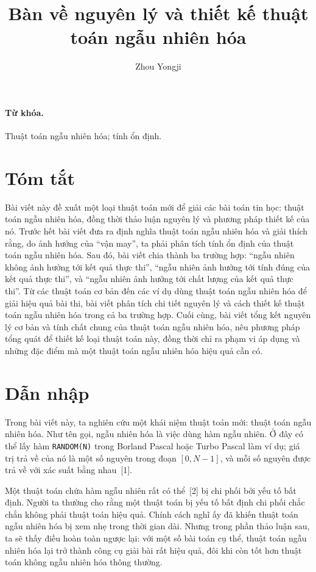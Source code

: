 \documentclass[11pt]{article}
\title{Bàn về nguyên lý và thiết kế thuật toán ngẫu nhiên hóa}
\author{Zhou Yongji}
\date{}
\begin{document}
\maketitle


\paragraph{Từ khóa.}
Thuật toán ngẫu nhiên hóa; tính ổn định.

\section*{Tóm tắt}

Bài viết này đề xuất một loại thuật toán mới để giải các bài toán tin học:
thuật toán ngẫu nhiên hóa, đồng thời thảo luận nguyên lý và phương pháp thiết
kế của nó. Trước hết bài viết đưa ra định nghĩa thuật toán ngẫu nhiên hóa và
giải thích rằng, do ảnh hưởng của ``vận may'', ta phải phân tích tính ổn định
của thuật toán ngẫu nhiên hóa. Sau đó, bài viết chia thành ba trường hợp:
``ngẫu nhiên không ảnh hưởng tới kết quả thực thi'', ``ngẫu nhiên ảnh hưởng
tới tính đúng của kết quả thực thi'', và ``ngẫu nhiên ảnh hưởng tới chất lượng
của kết quả thực thi''. Từ các thuật toán cơ bản đến các ví dụ dùng thuật
toán ngẫu nhiên hóa để giải hiệu quả bài thi, bài viết phân tích chi tiết
nguyên lý và cách thiết kế thuật toán ngẫu nhiên hóa trong cả ba trường hợp.
Cuối cùng, bài viết tổng kết nguyên lý cơ bản và tính chất chung của thuật
toán ngẫu nhiên hóa, nêu phương pháp tổng quát để thiết kế loại thuật toán
này, đồng thời chỉ ra phạm vi áp dụng và những đặc điểm mà một thuật toán
ngẫu nhiên hóa hiệu quả cần có.

\section{Dẫn nhập}

Trong bài viết này, ta nghiên cứu một khái niệm thuật toán mới: thuật toán
ngẫu nhiên hóa. Như tên gọi, ngẫu nhiên hóa là việc dùng hàm ngẫu nhiên. Ở
đây có thể lấy hàm \texttt{RANDOM(N)} trong Borland Pascal hoặc Turbo Pascal
làm ví dụ; giá trị trả về của nó là một số nguyên trong đoạn \([0,N-1]\), và
mỗi số nguyên được trả về với xác suất bằng nhau~[1].

Một thuật toán chứa hàm ngẫu nhiên rất có thể~[2] bị chi phối bởi yếu tố bất
định. Người ta thường cho rằng một thuật toán bị yếu tố bất định chi phối chắc
chắn không phải thuật toán hiệu quả. Chính cách nghĩ ấy đã khiến thuật toán
ngẫu nhiên hóa bị xem nhẹ trong thời gian dài. Nhưng trong phần thảo luận sau,
ta sẽ thấy điều hoàn toàn ngược lại: với một số bài toán cụ thể, thuật toán
ngẫu nhiên hóa lại trở thành công cụ giải bài rất hiệu quả, đôi khi còn tốt
hơn thuật toán không ngẫu nhiên hóa thông thường.
\end{document}
